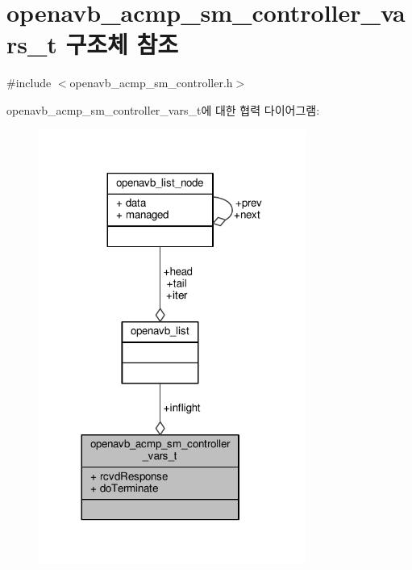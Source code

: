 \hypertarget{structopenavb__acmp__sm__controller__vars__t}{}\section{openavb\+\_\+acmp\+\_\+sm\+\_\+controller\+\_\+vars\+\_\+t 구조체 참조}
\label{structopenavb__acmp__sm__controller__vars__t}


{\ttfamily \#include $<$openavb\+\_\+acmp\+\_\+sm\+\_\+controller.\+h$>$}



openavb\+\_\+acmp\+\_\+sm\+\_\+controller\+\_\+vars\+\_\+t에 대한 협력 다이어그램\+:
\nopagebreak
\begin{figure}[H]
\begin{center}
\leavevmode
\includegraphics[width=248pt]{structopenavb__acmp__sm__controller__vars__t__coll__graph}
\end{center}
\end{figure}
